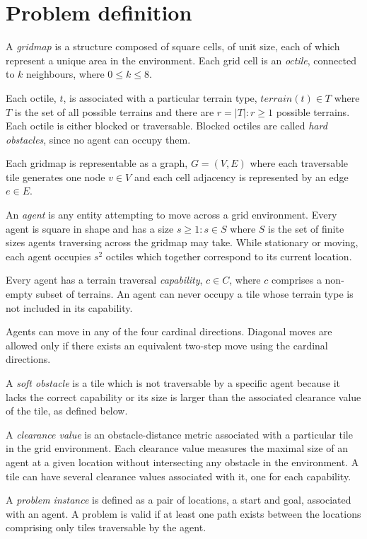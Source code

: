 \section{Problem definition}
A \emph{gridmap} is a structure composed of square cells, of unit size, each of which represent a unique area in the environment. 
Each grid cell is an \emph{octile}, connected to $k$ neighbours, where  $0 \leq k \leq 8$. 
\par \indent
Each octile, $t$, is associated with a particular terrain type, $terrain(t) \in T$ where $T$ is the set of all possible terrains and there are $r = |T| : r \geq 1$ possible terrains.
Each octile is either blocked or traversable. 
Blocked octiles are called \emph{hard obstacles}, since no agent can occupy them.
\par \indent
Each gridmap is representable as a graph, $G = (V, E)$ where each traversable tile generates one node $v \in V$ and each cell adjacency is represented by an edge $e \in E$.
\par \indent
An \emph{agent} is any entity attempting to move across a grid environment. 
Every agent is square in shape and has a size $s \geq 1 : s \in S$ where $S$ is the set of finite sizes agents traversing across the gridmap may take.
While stationary or moving, each agent occupies $s^2$ octiles which together correspond to its current location. 
\par \indent
Every agent has a terrain traversal \emph{capability}, $c \in C$, where $c$ comprises a non-empty subset of terrains.
An agent can never occupy a tile whose terrain type is not included in its capability.
\par \indent 
Agents can move in any of the four cardinal directions. 
Diagonal moves are allowed only if there exists an equivalent two-step move using the cardinal directions.
\par \indent
A \emph{soft obstacle} is a tile which is not traversable by a specific agent because it lacks the correct capability or its size is larger than the associated clearance value of the tile, as defined below. 
\par \indent
A \emph{clearance value} is an obstacle-distance metric associated with a particular tile in the grid environment. 
Each clearance value measures the maximal size of an agent at a given location without intersecting any obstacle in the environment. 
A tile can have several clearance values associated with it, one for each capability. 
\par \indent
A \emph{problem instance} is defined as a pair of locations, a start and goal, associated with an agent. A problem is valid if at least one path exists between the locations comprising only tiles traversable by the agent. 
